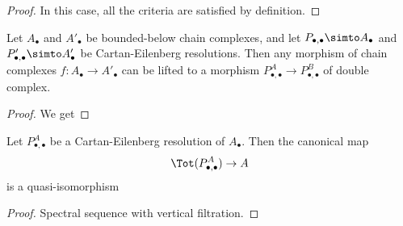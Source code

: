\documentclass[main.tex]{subfiles}
\begin{document}
\begin{proof}
  In this case, all the criteria are satisfied by definition.
\end{proof}

\begin{proposition}
  Let $A_{\bullet}$ and $A'_{\bullet}$ be bounded-below chain complexes, and let $P_{\bullet,\bullet} \simto A_{\bullet}$ and $P'_{\bullet,\bullet} \simto A'_{\bullet}$ be Cartan-Eilenberg resolutions. Then any morphism of chain complexes $f\colon A_{\bullet} \to A'_{\bullet}$ can be lifted to a morphism $P^{A}_{\bullet,\bullet} \to P^{B}_{\bullet,\bullet}$ of double complex.
\end{proposition}
\begin{proof}
  We get
\end{proof}

\begin{proposition}
  Let $P^{A}_{\bullet,\bullet}$ be a Cartan-Eilenberg resolution of $A_{\bullet}$. Then the canonical map
  \begin{equation*}
    \Tot(P^{A}_{\bullet,\bullet}) \to A
  \end{equation*}
  is a quasi-isomorphism
\end{proposition}
\begin{proof}
  Spectral sequence with vertical filtration.
\end{proof}
\end{document}
